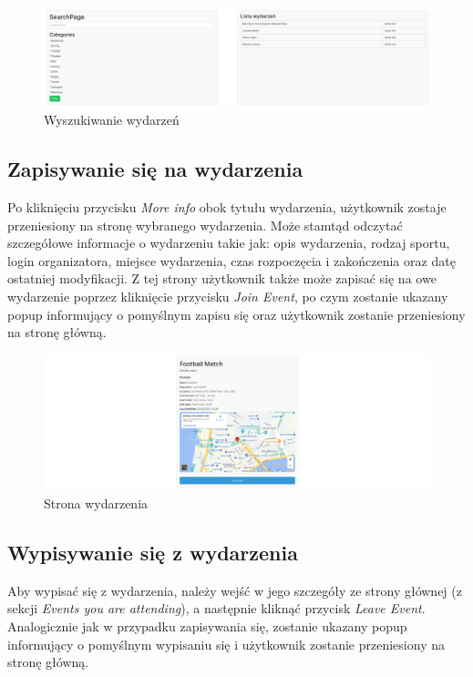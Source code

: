 \documentclass[11pt,a4paper]{article}
\begin{document}
\begin{figure} [H]
    \centering
    \includegraphics[width=1\linewidth]{pages/search_events.png}
    \caption{Wyszukiwanie wydarzeń}
\end{figure}

\subsection{Zapisywanie się na wydarzenia}

Po kliknięciu przycisku \textit{More info} obok tytułu wydarzenia, użytkownik zostaje przeniesiony na stronę wybranego wydarzenia. Może stamtąd odczytać szczegółowe informacje o wydarzeniu takie jak: opis wydarzenia, rodzaj sportu, login organizatora, miejsce wydarzenia, czas rozpoczęcia i zakończenia oraz datę ostatniej modyfikacji. Z tej strony użytkownik także może zapisać się na owe wydarzenie poprzez kliknięcie przycisku \textit{Join Event}, po czym zostanie ukazany popup informujący o pomyślnym zapisu się oraz użytkownik zostanie przeniesiony na stronę główną.

\begin{figure} [H]
    \centering
    \includegraphics[width=1\linewidth]{pages/event.png}
    \caption{Strona wydarzenia}
\end{figure}

\subsection{Wypisywanie się z wydarzenia}

Aby wypisać się z wydarzenia, należy wejść w jego szczegóły ze strony głównej (z sekcji \textit{Events you are attending}), a następnie kliknąć przycisk \textit{Leave Event}. Analogicznie jak w przypadku zapisywania się, zostanie ukazany popup informujący o pomyślnym wypisaniu się i użytkownik zostanie przeniesiony na stronę główną.
\end{document}
